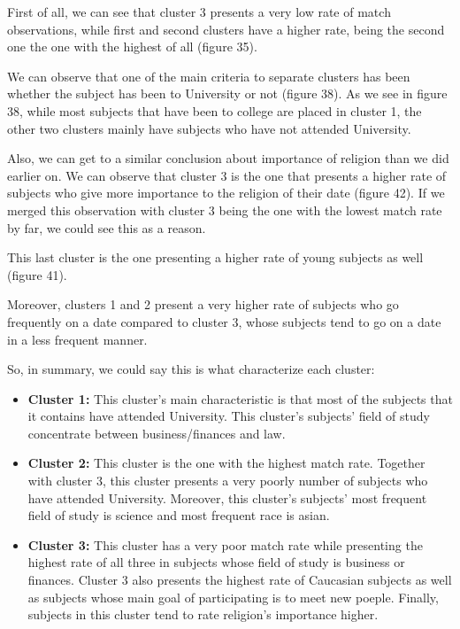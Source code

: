 \newpage
First of all, we can see that cluster 3 presents a very low rate of match observations, while first and second clusters have a higher rate, being the second one the one with the highest of all (figure 35).

We can observe that one of the main criteria to separate clusters has been whether the subject has been to University or not (figure 38). As we see in figure 38,  while most subjects that have been to college are placed in cluster 1, the other two clusters mainly have subjects who have not attended University.

Also, we can get to a similar conclusion about importance of religion than we did earlier on. We can observe that cluster 3 is the one that presents a higher rate of subjects who give more importance to the religion of their date (figure 42). If we merged this observation with cluster 3 being the one with the lowest match rate by far, we could see this as a reason.

This last cluster is the one presenting a higher rate of young subjects as well (figure 41).

Moreover, clusters 1 and 2 present a very higher rate of subjects who go frequently on a date compared to cluster 3, whose subjects tend to go on a date in a less frequent manner.
\newline \newline

So, in summary, we could say this is what characterize each cluster:
\begin{itemize}
	\item \textbf{Cluster 1:} This cluster's main characteristic is that most of the subjects that it contains have attended University. This cluster's subjects' field of study concentrate between business/finances and law.
    \item \textbf{Cluster 2:} This cluster is the one with the highest match rate. Together with cluster 3, this cluster presents a very poorly number of subjects who have attended University. Moreover, this cluster's subjects' most frequent field of study is science and most frequent race is asian.
    \item \textbf{Cluster 3:} This cluster has a very poor match rate while presenting the highest rate of all three in subjects whose field of study is business or finances. Cluster 3 also presents the highest rate of Caucasian subjects as well as subjects whose main goal of participating is to meet new poeple. Finally, subjects in this cluster tend to rate religion's importance higher.
\end{itemize}

